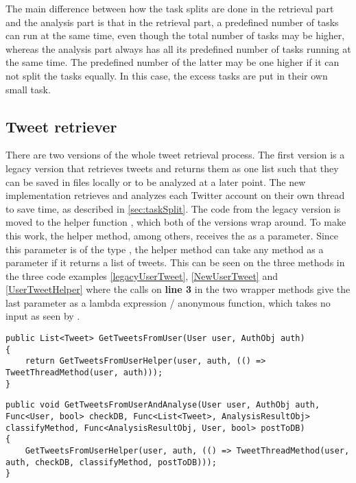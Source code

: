 The main difference between how the task splits are done in the retrieval
part and the analysis part is that in the retrieval part, a predefined number
of tasks can run at the same time, even though the total number of tasks may be
higher, whereas the analysis part always has all its predefined number of tasks
running at the same time. The predefined number of the latter may be one higher
if it can not split the tasks equally. In this case, the excess tasks are put in
their own small task.

\subsection{Tweet retriever} \label{sub:tweetretriever}
There are two versions of the whole tweet retrieval process. The first version
is a legacy version that retrieves tweets and returns them as one list such that
they can be saved in files locally or to be analyzed at a later point.
The new implementation retrieves and analyzes each Twitter account on their own
thread to save time, as described in \autoref{sec:taskSplit}. The code from the
legacy version is moved to the helper function ,
which both of the versions wrap around. To make this work, the helper method,
among others, receives the  as a parameter. Since this
parameter is of the type , the helper method can take
any method as a parameter if it returns a list of tweets. This can be
seen on the three methods in the three code examples \autoref{legacyUserTweet},
\autoref{NewUserTweet} and \autoref{UserTweetHelper} where the calls on
\textbf{line 3} in the two wrapper methods give the last parameter as a lambda
expression / anonymous function, which takes no input as seen by \textc{()=>}.\\

\begin{minipage}[H]{\linewidth}
\begin{lstlisting}[caption = Legacy method call. , label = legacyUserTweet ] 
public List<Tweet> GetTweetsFromUser(User user, AuthObj auth)
{	
    return GetTweetsFromUserHelper(user, auth, (() => TweetThreadMethod(user, auth)));
}
\end{lstlisting}
\end{minipage}

\begin{minipage}[H]{\linewidth}
\begin{lstlisting}[caption = Current method call to speed up execution. , label
= NewUserTweet ] 
public void GetTweetsFromUserAndAnalyse(User user, AuthObj auth, Func<User, bool> checkDB, Func<List<Tweet>, AnalysisResultObj> classifyMethod, Func<AnalysisResultObj, User, bool> postToDB)
{
    GetTweetsFromUserHelper(user, auth, (() => TweetThreadMethod(user, auth, checkDB, classifyMethod, postToDB)));
}
\end{lstlisting}
\end{minipage}


